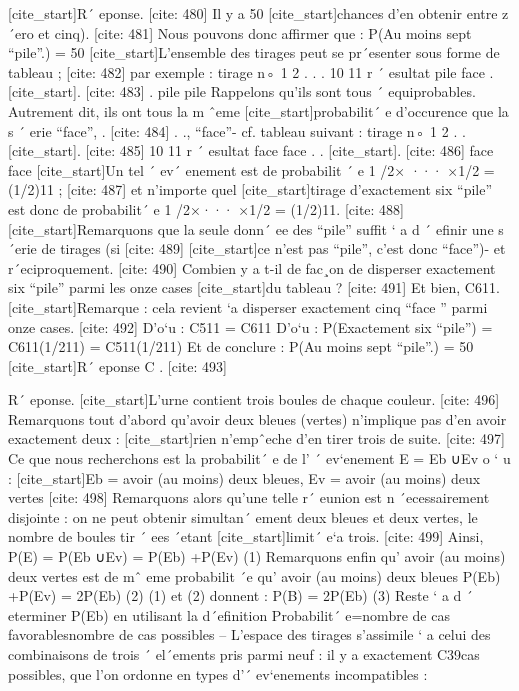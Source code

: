 [cite_start]R´ eponse. [cite: 480]
Il y a 50%
 [cite_start]chances d’en obtenir entre z´ero et cinq). [cite: 481]
Nous pouvons donc affirmer que : 
 P(Au moins sept “pile”.) = 50%
 [cite_start]L’ensemble des tirages peut se pr´esenter sous forme de tableau ; [cite: 482]
par exemple : 
 tirage n◦ 1 2 . . . 10 11
 r
 ´ esultat pile face . [cite_start]. [cite: 483]
. pile pile
 Rappelons qu’ils sont tous ´ equiprobables. Autrement dit, ils ont tous la m ˆeme 
 [cite_start]probabilit´ e d’occurence que la s ´ erie “face”, . [cite: 484]
. ., “face”- cf. tableau suivant :
 tirage n◦ 1 2 . . [cite_start]. [cite: 485]
10 11
 r
 ´ esultat face face . . [cite_start]. [cite: 486]
face face
 [cite_start]Un tel ´ ev´ enement est de probabilit ´ e 1 /2× ··· ×1/2 = (1/2)11 ; [cite: 487]
et n’importe quel
 [cite_start]tirage d’exactement six “pile” est donc de probabilit´ e 1 /2×··· ×1/2 = (1/2)11. [cite: 488]
[cite_start]Remarquons que la seule donn´ ee des “pile” suffit ` a d ´ efinir une s ´erie de tirages (si [cite: 489]
[cite_start]ce n’est pas “pile”, c’est donc “face”)- et r´eciproquement. [cite: 490]
Combien y a t-il de fac¸on de disperser exactement six “pile” parmi les onze cases
 [cite_start]du tableau ? [cite: 491]
Et bien, C611.
 [cite_start]Remarque : cela revient `a disperser exactement cinq “face ” parmi onze cases. [cite: 492]
D’o`u : 
 C511 = C611
 D’o`u : 
 P(Exactement six “pile”) = C611(1/211) = C511(1/211)
 Et de conclure :
 P(Au moins sept “pile”.) = 50%
 [cite_start]R´ eponse C . [cite: 493]

R´ eponse. [cite_start]L’urne contient trois boules de chaque couleur. [cite: 496]
Remarquons tout
 d’abord qu’avoir deux bleues (vertes) n’implique pas d’en avoir exactement deux :
 [cite_start]rien n’empˆeche d’en tirer trois de suite. [cite: 497]
Ce que nous recherchons est la probabilit´ e de l’ ´ ev`enement 
 E = Eb ∪Ev
 o
 `
 u : 
 [cite_start]Eb = {avoir (au moins) deux bleues}, Ev = {avoir (au moins) deux vertes} [cite: 498]
Remarquons alors qu’une telle r´ eunion est n ´ecessairement disjointe : on ne peut 
 obtenir simultan´ ement deux bleues et deux vertes, le nombre de boules tir ´ ees ´etant 
 [cite_start]limit´ e`a trois. [cite: 499]
Ainsi, 
 P(E) = P(Eb ∪Ev) = P(Eb) +P(Ev) (1)
 Remarquons enfin qu’ {avoir (au moins) deux vertes} est de mˆ eme probabilit ´e qu’ 
 {avoir (au moins) deux bleues}
 P(Eb) +P(Ev) = 2P(Eb) (2)
 (1) et (2) donnent :
 P(B) = 2P(Eb) (3)
 Reste ` a d ´ eterminer P(Eb) en utilisant la d´efinition 
 Probabilit´ e=nombre de cas favorablesnombre de cas possibles
 – L’espace des tirages s’assimile ` a celui des combinaisons de trois ´ el´ements 
 pris parmi neuf : il y a exactement C39cas possibles, que l’on ordonne en
 types d’´ ev`enements incompatibles : 
 
